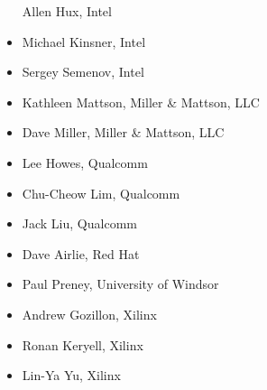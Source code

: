\begin{multicols}{2}
\begin{itemize}
    Allen Hux, Intel
\item
    Michael Kinsner, Intel
\item
    Sergey Semenov, Intel
\item
    Kathleen Mattson, Miller \& Mattson, LLC
\item
    Dave Miller, Miller \& Mattson, LLC
\item
    Lee Howes, Qualcomm
\item
    Chu-Cheow Lim, Qualcomm
\item
    Jack Liu, Qualcomm
\item
    Dave Airlie, Red Hat
\item
    Paul Preney, University of Windsor
\item
    Andrew Gozillon, Xilinx
\item
    Ronan Keryell, Xilinx
\item
    Lin-Ya Yu, Xilinx
\end{itemize}
\end{multicols}

